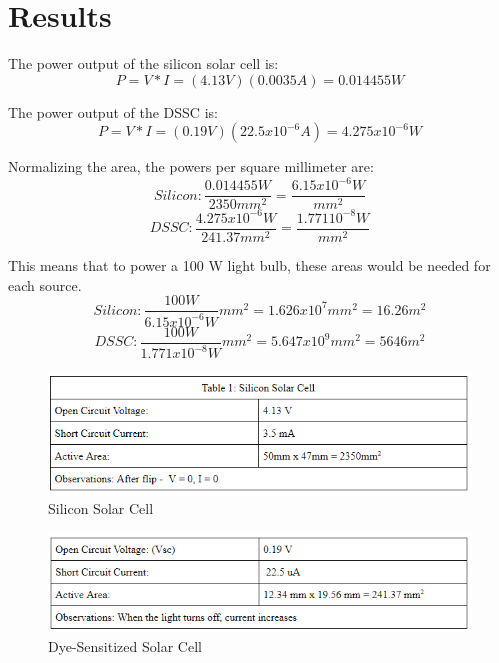 \documentclass{article}
\begin{document}
\section{Results}

The power output of the silicon solar cell is: 
$$P = V*I = (4.13 V)(0.0035 A) = 0.014455 W $$

The power output of the DSSC is: 
$$P = V * I = (0.19 V)(22.5 x 10^{-6} A) = 4.275 x 10^{-6} W $$

Normalizing the area, the powers per square millimeter are:
$$Silicon: \frac{0.014455 W}{2350 mm^2} = \frac{6.15 x 10^{-6} W}{mm^2}$$
$$DSSC: \frac{4.275 x 10^{-6} W}{241.37 mm^2} = \frac{1.771  10^{-8} W}{mm^2}$$

This means that to power a 100 W light bulb, these areas would be needed for each source.
$$Silicon: \frac{100 W}{6.15 x 10^{-6} W}{mm^2} = 1.626 x 10^7 mm^2 = 16.26 m^2 $$
$$DSSC: \frac{100 W}{1.771 x 10^{-8} W}{mm^2} = 5.647 x 10^9 mm^2 = 5646 m^2 $$

\begin{figure}
\begin{center}
\includegraphics[width=400pt]{Screenshot_1.png}
\caption{Silicon Solar Cell}
\end{center}
\end{figure}

\begin{figure}
\begin{center}
\includegraphics[width=400pt]{Screenshot_2.png}
\caption{Dye-Sensitized Solar Cell}
\end{center}
\end{figure}
\end{document}

